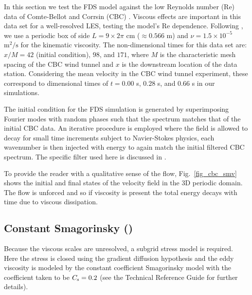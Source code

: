 \documentclass[11pt]{book}
\begin{document}
In this section we test the FDS model against the low Reynolds number (Re) data of Comte-Bellot and Corrsin (CBC) \cite{CBC}. Viscous effects are important in this data set for a well-resolved LES, testing the model's Re dependence.  Following \cite{SdBK}, we use a periodic box of side $L = 9 \times 2\pi$ cm ($\approx 0.566$ m) and $\nu = 1.5 \times 10^{-5}$ $\mbox{m}^2/\mbox{s}$ for the kinematic viscosity. The non-dimensional times for this data set are: $x/M = 42$ (initial condition), $98$, and $171$, where $M$ is the characteristic mesh spacing of the CBC wind tunnel and $x$ is the downstream location of the data station. Considering the mean velocity in the CBC wind tunnel experiment, these correspond to dimensional times of $t = 0.00$ s, $0.28$ s, and $0.66$ s in our simulations.

The initial condition for the FDS simulation is generated by superimposing Fourier modes with random phases such that the spectrum matches that of the initial CBC data.  An iterative procedure is employed where the field is allowed to decay for small time increments subject to Navier-Stokes physics, each wavenumber is then injected with energy to again match the initial filtered CBC spectrum.  The specific filter used here is discussed in \cite{McDermott:2005b}.

To provide the reader with a qualitative sense of the flow, Fig.~\ref{fig_cbc_smv} shows the initial and final states of the velocity field in the 3D periodic domain.  The flow is unforced and so if viscosity is present the total energy decays with time due to viscous dissipation.

\subsection{Constant Smagorinsky (\texorpdfstring{}{csmag})}

Because the viscous scales are unresolved, a subgrid stress model is required. Here the stress is closed using the gradient diffusion hypothesis and the eddy viscosity is modeled by the constant coefficient Smagorinsky model with the coefficient taken to be $C_{\rm s} = 0.2$ (see the Technical Reference Guide for further details).
\end{document}
